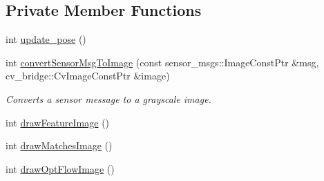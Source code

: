 \subsection*{\-Private \-Member \-Functions}
\begin{DoxyCompactItemize}
\item 
int \hyperlink{classLRM_1_1MonoOdometer_a8c7914efde9c07323c171d7adfaf656e}{update\-\_\-pose} ()
\item 
int \hyperlink{classLRM_1_1MonoOdometer_ab33c598738d4c565cae80ca110f3ab63}{convert\-Sensor\-Msg\-To\-Image} (const sensor\-\_\-msgs\-::\-Image\-Const\-Ptr \&msg, cv\-\_\-bridge\-::\-Cv\-Image\-Const\-Ptr \&image)
\begin{DoxyCompactList}\small\item\em \-Converts a sensor message to a grayscale image. \end{DoxyCompactList}\item 
int \hyperlink{classLRM_1_1MonoOdometer_acdfde454162a9fba808c5e99069e5831}{draw\-Feature\-Image} ()
\item 
int \hyperlink{classLRM_1_1MonoOdometer_a0e648fa164c12e1bb405c5e0de9607cf}{draw\-Matches\-Image} ()
\item 
int \hyperlink{classLRM_1_1MonoOdometer_ac3e11ffd664dfd8b06068f77dd475ed4}{draw\-Opt\-Flow\-Image} ()
\end{DoxyCompactItemize}
